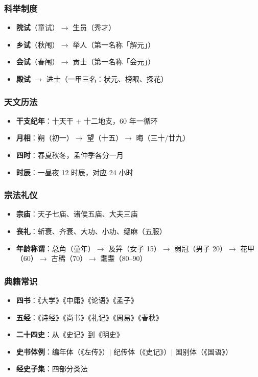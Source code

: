 \subsubsection{科举制度}

\begin{itemize}
  \item \textbf{院试}（童试）$\rightarrow$ 生员（秀才）
  \item \textbf{乡试}（秋闱）$\rightarrow$ 举人（第一名称「解元」）
  \item \textbf{会试}（春闱）$\rightarrow$ 贡士（第一名称「会元」）
  \item \textbf{殿试} $\rightarrow$ 进士（一甲三名：状元、榜眼、探花）
\end{itemize}

\subsubsection{天文历法}

\begin{itemize}
  \item \textbf{干支纪年}：十天干 + 十二地支，60 年一循环
  \item \textbf{月相}：朔（初一）$\rightarrow$ 望（十五）$\rightarrow$ 晦（三十/廿九）
  \item \textbf{四时}：春夏秋冬，孟仲季各分一月
  \item \textbf{时辰}：一昼夜 12 时辰，对应 24 小时
\end{itemize}

\subsubsection{宗法礼仪}

\begin{itemize}
  \item \textbf{宗庙}：天子七庙、诸侯五庙、大夫三庙
  \item \textbf{丧礼}：斩衰、齐衰、大功、小功、缌麻（五服）
  \item \textbf{年龄称谓}：总角（童年）$\rightarrow$ 及笄（女子 15）$\rightarrow$ 弱冠（男子 20）$\rightarrow$ 花甲（60）$\rightarrow$ 古稀（70）$\rightarrow$ 耄耋（80--90）
\end{itemize}

\subsubsection{典籍常识}

\begin{itemize}
  \item \textbf{四书}：《大学》《中庸》《论语》《孟子》
  \item \textbf{五经}：《诗经》《尚书》《礼记》《周易》《春秋》
  \item \textbf{二十四史}：从《史记》到《明史》
  \item \textbf{史书体例}：编年体（《左传》）$\mid$ 纪传体（《史记》）$\mid$ 国别体（《国语》）
  \item \textbf{经史子集}：四部分类法
\end{itemize}
